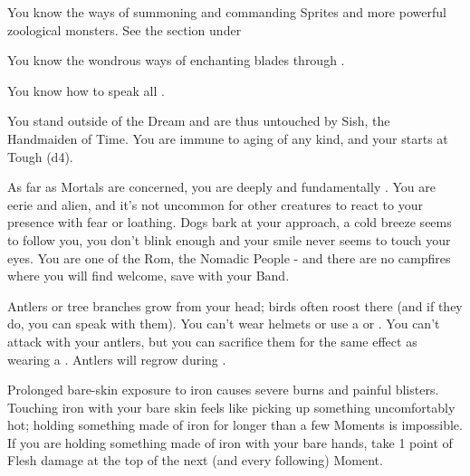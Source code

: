 \begin{multicols*}{2}
    

   You know the ways of summoning and commanding Sprites and more powerful zoological monsters. See the section  under 


  You know the wondrous ways of enchanting blades through . 


  You know how to speak all .


  You stand outside of the Dream and are thus untouched by Sish, the Handmaiden of Time. You are immune to aging of any kind, and your \DEATH starts at Tough (d4).

\newpage



  As far as Mortals are concerned, you are deeply and fundamentally . You are eerie and alien, and it's not uncommon for other creatures to react to your presence with fear or loathing. Dogs bark at your approach, a cold breeze seems to follow you, you don't blink enough and your smile never seems to touch your eyes. You are one of the Rom, the Nomadic People - and there are no campfires where you will find welcome, save with your Band.


  Antlers or tree branches grow from your head; birds often roost there (and if they do, you can speak with them). You can't wear helmets or use a  or . You can't attack with your antlers, but you can sacrifice them for the same effect as wearing a . Antlers will regrow during .

    
    Prolonged bare-skin exposure to iron causes severe burns and painful blisters. Touching iron with your bare skin feels like picking up something uncomfortably hot; holding something made of iron for longer than a few Moments is impossible. If you are holding something made of iron with your bare hands, take 1 point of Flesh damage at the top of the next (and every following) Moment. 


\end{multicols*}
